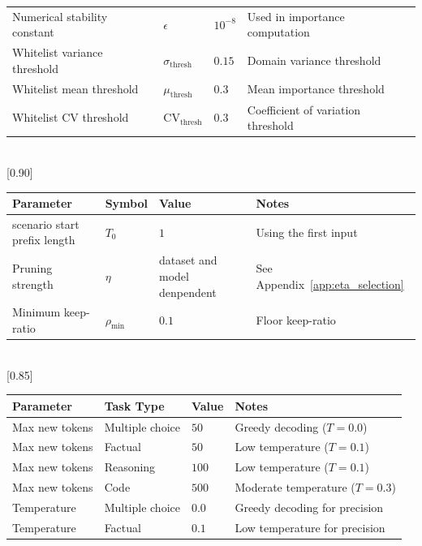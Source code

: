 \begin{table}[!t]
{\begin{tabular}{>{\raggedright\arraybackslash}p{3.5cm}>{\centering\arraybackslash}p{2.2cm}>{\centering\arraybackslash}p{2.0cm}>{\raggedright\arraybackslash}p{4.5cm}}
\midrule
Numerical stability constant & $\epsilon$ & $10^{-8}$ & Used in importance computation \\
Whitelist variance threshold & $\sigma_{\mathrm{thresh}}$ & $0.15$ & Domain variance threshold \\
Whitelist mean threshold & $\mu_{\mathrm{thresh}}$ & $0.3$ & Mean importance threshold \\
Whitelist CV threshold & $\mathrm{CV}_{\mathrm{thresh}}$ & $0.3$ & Coefficient of variation threshold \\
\bottomrule
\end{tabular}
} \\[0.5em]
[0.90\textwidth]{
\begin{tabular}{>{\raggedright\arraybackslash}p{3.5cm}>{\centering\arraybackslash}p{2.2cm}>{\centering\arraybackslash}p{4.0cm}>{\raggedright\arraybackslash}p{2.7cm}}
\toprule
\textbf{Parameter} & \textbf{Symbol} & \textbf{Value} & \textbf{Notes} \\
\midrule
scenario start prefix length & $T_0$ & $1$ & Using the first input \\
Pruning strength & $\eta$ & dataset and model denpendent & See Appendix~\ref{app:eta_selection} \\
Minimum keep-ratio & $\rho_{\min}$ & $0.1$ & Floor keep-ratio \\
\bottomrule
\end{tabular}
} \\[0.5em]
[0.85\textwidth]{
\begin{tabular}{>{\raggedright\arraybackslash}p{3.2cm}>{\centering\arraybackslash}p{2.3cm}>{\centering\arraybackslash}p{1.8cm}>{\raggedright\arraybackslash}p{4.9cm}}
\toprule
\textbf{Parameter} & \textbf{Task Type} & \textbf{Value} & \textbf{Notes} \\
\midrule
Max new tokens & Multiple choice & $50$ & Greedy decoding ($T=0.0$) \\
Max new tokens & Factual & $50$ & Low temperature ($T=0.1$) \\
Max new tokens & Reasoning & $100$ & Low temperature ($T=0.1$) \\
Max new tokens & Code & $500$ & Moderate temperature ($T=0.3$) \\
Temperature & Multiple choice & $0.0$ & Greedy decoding for precision \\
Temperature & Factual & $0.1$ & Low temperature for precision \\

\end{tabular}}
\end{table}
